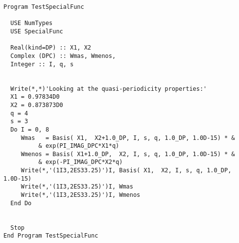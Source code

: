 \begin{lstlisting}[emph=Basis,
                   emphstyle=\color{blue},
                   frame=trBL,
                   caption=Computing the bassi of a special Hilbert
                   space (details in~\cite{Gonzalez-Arroyo:2004xu}).,
                   label=basis]
Program TestSpecialFunc

  USE NumTypes
  USE SpecialFunc

  Real(kind=DP) :: X1, X2
  Complex (DPC) :: Wmas, Wmenos,
  Integer :: I, q, s


  Write(*,*)'Looking at the quasi-periodicity properties:'
  X1 = 0.97834D0
  X2 = 0.873873D0
  q = 4
  s = 3
  Do I = 0, 8
     Wmas   = Basis( X1,  X2+1.0_DP, I, s, q, 1.0_DP, 1.0D-15) * &
          & exp(PI_IMAG_DPC*X1*q)
     Wmenos = Basis( X1+1.0_DP,  X2, I, s, q, 1.0_DP, 1.0D-15) * &
          & exp(-PI_IMAG_DPC*X2*q)
     Write(*,'(1I3,2ES33.25)')I, Basis( X1,  X2, I, s, q, 1.0_DP, 1.0D-15)
     Write(*,'(1I3,2ES33.25)')I, Wmas
     Write(*,'(1I3,2ES33.25)')I, Wmenos
  End Do


  Stop
End Program TestSpecialFunc
\end{lstlisting}



